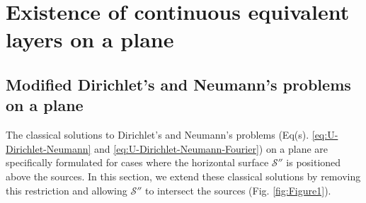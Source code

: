 \section{Existence of continuous equivalent layers on a plane}
\label{sec:planar_eqlayer_theorem}

\subsection{Modified Dirichlet's and Neumann's problems on a plane}

The classical solutions to Dirichlet’s and Neumann’s problems (Eq(s). \ref{eq:U-Dirichlet-Neumann} 
and \ref{eq:U-Dirichlet-Neumann-Fourier}) on a plane are specifically formulated for cases where 
the horizontal surface $\mathcal{S}''$ is positioned above the sources. In this section, we extend 
these classical solutions by removing this restriction and allowing $\mathcal{S}''$ to intersect 
the sources (Fig. \ref{fig:Figure1}).
 
